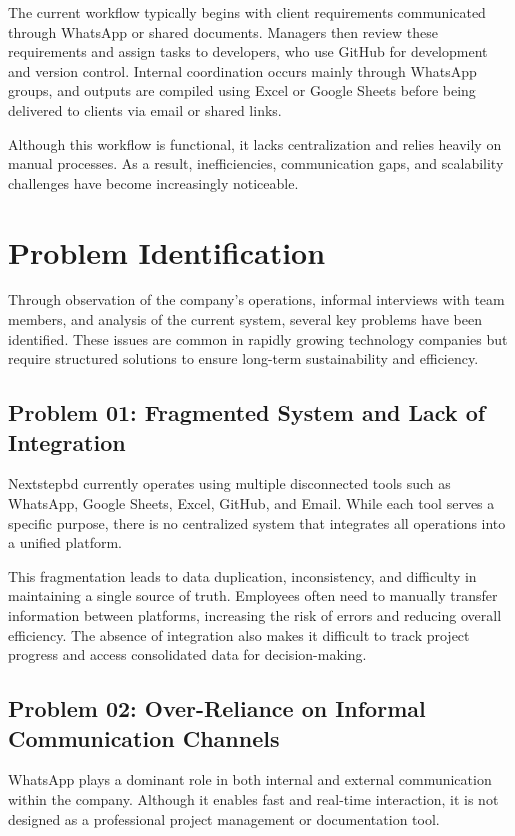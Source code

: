 \documentclass[12pt,a4paper]{report}
\begin{document}
The current workflow typically begins with client requirements communicated through WhatsApp or shared documents. Managers then review these requirements and assign tasks to developers, who use GitHub for development and version control. Internal coordination occurs mainly through WhatsApp groups, and outputs are compiled using Excel or Google Sheets before being delivered to clients via email or shared links.

Although this workflow is functional, it lacks centralization and relies heavily on manual processes. As a result, inefficiencies, communication gaps, and scalability challenges have become increasingly noticeable.

\section{Problem Identification}

Through observation of the company's operations, informal interviews with team members, and analysis of the current system, several key problems have been identified. These issues are common in rapidly growing technology companies but require structured solutions to ensure long-term sustainability and efficiency.

\subsection{Problem 01: Fragmented System and Lack of Integration}

Nextstepbd currently operates using multiple disconnected tools such as WhatsApp, Google Sheets, Excel, GitHub, and Email. While each tool serves a specific purpose, there is no centralized system that integrates all operations into a unified platform.

This fragmentation leads to data duplication, inconsistency, and difficulty in maintaining a single source of truth. Employees often need to manually transfer information between platforms, increasing the risk of errors and reducing overall efficiency. The absence of integration also makes it difficult to track project progress and access consolidated data for decision-making.

\subsection{Problem 02: Over-Reliance on Informal Communication Channels}

WhatsApp plays a dominant role in both internal and external communication within the company. Although it enables fast and real-time interaction, it is not designed as a professional project management or documentation tool.
\end{document}
